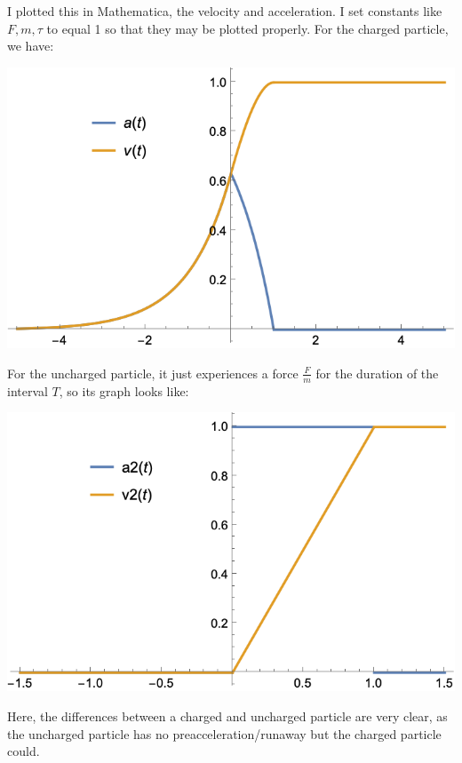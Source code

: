 \documentclass[10pt]{article}
\begin{document}
\begin{enumerate}[label=(\alph*)]
			\begin{solution}
				I plotted this in Mathematica, the velocity and acceleration. I set constants like \( F, m,
				\tau \) to equal 1 so that they may be plotted properly. For the charged particle, we have:
				\begin{center}
					\includegraphics[scale=0.5]{q3e1.png}
				\end{center}
				For the uncharged particle, it just experiences a force \( \frac{F}{m} \) for the duration of
				the interval \( T \), so its graph looks like:
				\begin{center}
					\includegraphics[scale=0.5]{q3e2.png}
				\end{center}
				Here, the differences between a charged and uncharged particle are very clear, as the
				uncharged particle has no preacceleration/runaway but the charged particle could. 
			\end{solution}
	\end{enumerate}
\end{document}
